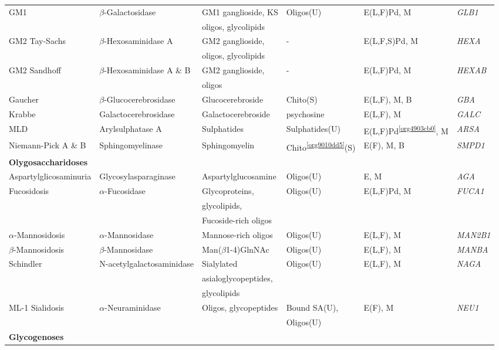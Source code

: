 \documentclass[landscape]{article}
\begin{document}
\begin{longtable}{llllll}
GM1 & \(\beta\)-Galactosidase & GM1 ganglioside, KS & Oligos(U) & E(L,F)Pd, M & \emph{GLB1}\\
 &  & oligos, glycolipids &  &  & \\
GM2 Tay-Sachs & \(\beta\)-Hexosaminidase A & GM2 ganglioside, & - & E(L,F,S)Pd, M & \emph{HEXA}\\
 &  & oligos, glycolipids &  &  & \\
GM2 Sandhoff & \(\beta\)-Hexosaminidase A \& B & GM2 ganglioside, & - & E(L,F)Pd, M & \emph{HEXAB}\\
 &  & oligos &  &  & \\
Gaucher & \(\beta\)-Glucocerebrosidase & Glucocerebroside & Chito\footnotemark(S) & E(L,F), M, B & \emph{GBA}\\
Krabbe & Galactocerebrosidase & Galactocerebroside & psychosine & E(L,F), M & \emph{GALC}\\
MLD & Arylsulphatase A & Sulphatides & Sulphatides(U) & E(L,F)Pd\textsuperscript{\ref{org4903cb0}}, M & \emph{ARSA}\\
Niemann-Pick A \& B & Sphingomyelinase & Sphingomyelin & Chito\textsuperscript{\ref{org9010dd5}}(S) & E(F), M, B & \emph{SMPD1}\\
\hline
\textbf{Olygosaccharidoses} &  &  &  &  & \\
Aspartylglicosaminuria & Glycosylasparaginase & Aspartylglucosamine & Oligos(U) & E, M & \emph{AGA}\\
Fucosidosis & \(\alpha\)-Fucosidase & Glycoproteins, & Oligos(U) & E(L,F)Pd, M & \emph{FUCA1}\\
 &  & glycolipids, &  &  & \\
 &  & Fucoside-rich oligos &  &  & \\
\(\alpha\)-Mannosidosis & \(\alpha\)-Mannosidase & Mannose-rich oligos & Oligos(U) & E(L,F), M & \emph{MAN2B1}\\
\(\beta\)-Mannosidosis & \(\beta\)-Mannosidase & Man(\(\beta\)1-4)GlnNAc & Oligos(U) & E(L,F), M & \emph{MANBA}\\
Schindler & N-acetylgalactosaminidase & Sialylated & Oligos(U) & E(L,F), M & \emph{NAGA}\\
 &  & asialoglycopeptides, &  &  & \\
 &  & glycolipids &  &  & \\
ML-1 Sialidosis & \(\alpha\)-Neuraminidase & Oligos, glycopeptides & Bound SA(U), & E(F), M & \emph{NEU1}\\
 &  &  & Oligos(U) &  & \\
\hline
\textbf{Glycogenoses} &  &  &  &  & \\

\end{longtable}
\end{document}

